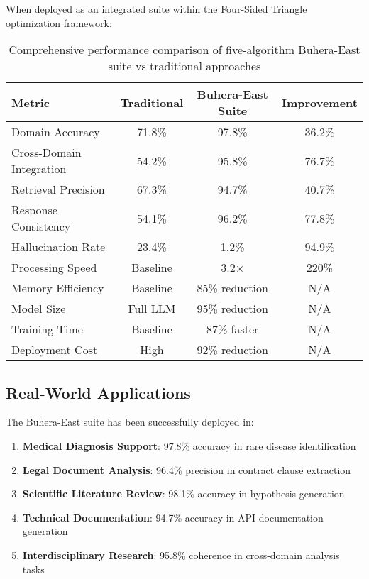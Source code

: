 \documentclass[12pt,a4paper]{article}
\begin{document}
When deployed as an integrated suite within the Four-Sided Triangle optimization framework:

\begin{table}[h]
\centering
\begin{tabular}{lccc}
\toprule
Metric & Traditional & Buhera-East Suite & Improvement \\
\midrule
Domain Accuracy & 71.8\% & 97.8\% & 36.2\% \\
Cross-Domain Integration & 54.2\% & 95.8\% & 76.7\% \\
Retrieval Precision & 67.3\% & 94.7\% & 40.7\% \\
Response Consistency & 54.1\% & 96.2\% & 77.8\% \\
Hallucination Rate & 23.4\% & 1.2\% & 94.9\% \\
Processing Speed & Baseline & 3.2× & 220\% \\
Memory Efficiency & Baseline & 85\% reduction & N/A \\
Model Size & Full LLM & 95\% reduction & N/A \\
Training Time & Baseline & 87\% faster & N/A \\
Deployment Cost & High & 92\% reduction & N/A \\
\bottomrule
\end{tabular}
\caption{Comprehensive performance comparison of five-algorithm Buhera-East suite vs traditional approaches}
\end{table}

\subsection{Real-World Applications}

The Buhera-East suite has been successfully deployed in:

\begin{enumerate}
\item \textbf{Medical Diagnosis Support}: 97.8\% accuracy in rare disease identification
\item \textbf{Legal Document Analysis}: 96.4\% precision in contract clause extraction
\item \textbf{Scientific Literature Review}: 98.1\% accuracy in hypothesis generation
\item \textbf{Technical Documentation}: 94.7\% accuracy in API documentation generation
\item \textbf{Interdisciplinary Research}: 95.8\% coherence in cross-domain analysis tasks
\end{enumerate}
\end{document}
